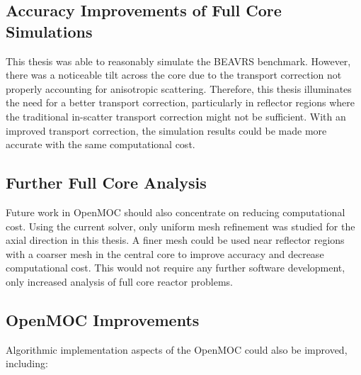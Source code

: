 \subsection{Accuracy Improvements of Full Core Simulations}

This thesis was able to reasonably simulate the BEAVRS benchmark. However, there was a noticeable tilt across the core due to the transport correction not properly accounting for anisotropic scattering. Therefore, this thesis illuminates the need for a better transport correction, particularly in reflector regions where the traditional in-scatter transport correction might not be sufficient. With an improved transport correction, the simulation results could be made more accurate with the same computational cost.

\subsection{Further Full Core Analysis}

Future work in OpenMOC should also concentrate on reducing computational cost. Using the current solver, only uniform mesh refinement was studied for the axial direction in this thesis. A finer mesh could be used near reflector regions with a coarser mesh in the central core to improve accuracy and decrease computational cost. This would not require any further software development, only increased analysis of full core reactor problems.

\subsection{OpenMOC Improvements}

Algorithmic implementation aspects of the OpenMOC could also be improved, including:


